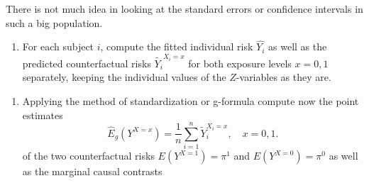 \documentclass[
]{book}
\newenvironment{Shaded}{\begin{snugshade}}{\end{snugshade}}
\newcommand{\AttributeTok}[1]{\textcolor[rgb]{0.13,0.29,0.53}{#1}}
\newcommand{\CommentTok}[1]{\textcolor[rgb]{0.56,0.35,0.01}{\textit{#1}}}
\newcommand{\DecValTok}[1]{\textcolor[rgb]{0.00,0.00,0.81}{#1}}
\newcommand{\FunctionTok}[1]{\textcolor[rgb]{0.13,0.29,0.53}{\textbf{#1}}}
\newcommand{\NormalTok}[1]{#1}
\newcommand{\OtherTok}[1]{\textcolor[rgb]{0.56,0.35,0.01}{#1}}
\newcommand{\SpecialCharTok}[1]{\textcolor[rgb]{0.81,0.36,0.00}{\textbf{#1}}}
\newcommand{\StringTok}[1]{\textcolor[rgb]{0.31,0.60,0.02}{#1}}
\providecommand{\tightlist}{%
  \setlength{\itemsep}{0pt}\setlength{\parskip}{0pt}}
\begin{document}
There is not much idea in looking at the standard errors or confidence
intervals in such a big population.

\begin{enumerate}
\def\labelenumi{\arabic{enumi}.}
\setcounter{enumi}{1}
\tightlist
\item
  For each subject \(i\), compute the fitted individual risk
  \(\widehat{Y_i}\) as well as the predicted counterfactual risks
  \(\widetilde{Y_i}^{X_i=x}\) for both exposure levels \(x=0,1\)
  separately, keeping the individual values of the \(Z\)-variables as
  they are.
\end{enumerate}

\begin{Shaded}
\end{Shaded}

\begin{enumerate}
\def\labelenumi{\arabic{enumi}.}
\setcounter{enumi}{2}
\tightlist
\item
  Applying the method of standardization or g-formula compute now the
  point estimates \[ \widehat{E}_g(Y^{X=x}) =
   \frac{1}{n} \sum_{i=1}^n \widetilde{Y}_i^{X_i=x}, \quad x=0,1. \]
  of the two counterfactual risks \(E(Y^{X=1}) = \pi^1\) and
  \(E(Y^{X=0})=\pi^0\) as well as the marginal causal contrasts
\end{enumerate}
\end{document}
